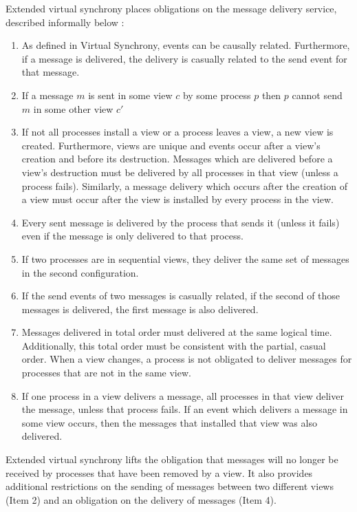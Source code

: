 Extended virtual synchrony places obligations on the message delivery service, described informally below \cite{EXTENDEDVIRTUALSYNCHRONY}:
\begin{enumerate}
	\item As defined in Virtual Synchrony, events can be causally related.
		Furthermore, if a message is delivered, the delivery is casually
		related to the send event for that message. 
	\item If a message $m$ is sent in some view $c$ by some process $p$ then $p$
		cannot send $m$ in some other view $c'$
	\item If not all processes install a view or a process leaves a view, a new
		view is created. Furthermore, views are unique and events occur after a
		view's creation and before its destruction. Messages which are delivered
		before a view's destruction must be delivered by all processes in that
		view (unless a process fails). Similarly, a message delivery which occurs
		after the creation of a view must occur after the view is installed by
		every process in the view.
	\item Every sent message is delivered by the process that sends it (unless it
		fails) even if the message is only delivered to that process.
	\item If two processes are in sequential views, they deliver the same set of
		messages in the second configuration.
	\item If the send events of two messages is casually related, if the
		second of those messages is delivered, the first message is also delivered.
	\item Messages delivered in total order must delivered at the same logical time.
		Additionally, this total order must be consistent with the partial, casual
		order. When a view changes, a process is not obligated to deliver messages
		for processes that are not in the same view.
	\item If one process in a view delivers a message, all processes in that view
		deliver the message, unless that process fails. If an event which delivers
		a message in some view occurs, then the messages that installed that view
		was also delivered.
\end{enumerate}

Extended virtual synchrony lifts the obligation that messages will no longer be received by processes that have been removed by a view. It also provides additional restrictions on the sending of messages between two different views (Item 2) and an obligation on the delivery of messages (Item 4). 


